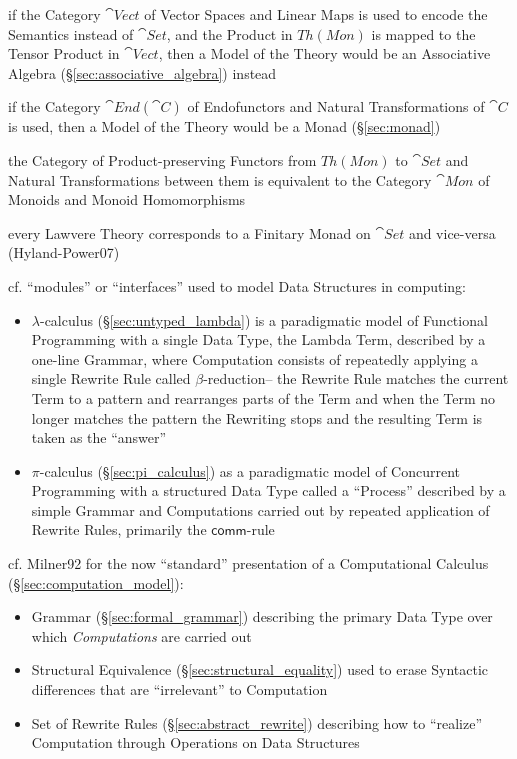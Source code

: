 if the Category $\cat{Vect}$ of Vector Spaces and Linear Maps is used to encode
the Semantics instead of $\cat{Set}$, and the Product in $Th(Mon)$ is mapped to
the Tensor Product in $\cat{Vect}$, then a Model of the Theory would be an
Associative Algebra (\S\ref{sec:associative_algebra}) instead

if the Category $\cat{End}(\cat{C})$ of Endofunctors and Natural Transformations
of $\cat{C}$ is used, then a Model of the Theory would be a Monad
(\S\ref{sec:monad})

the Category of Product-preserving Functors from $Th(Mon)$ to $\cat{Set}$ and
Natural Transformations between them is equivalent to the Category $\cat{Mon}$
of Monoids and Monoid Homomorphisms

every Lawvere Theory corresponds to a Finitary Monad on $\cat{Set}$ and
vice-versa (Hyland-Power07)

cf. ``modules'' or ``interfaces'' used to model Data Structures in computing:
\begin{itemize}
\item $\lambda$-calculus (\S\ref{sec:untyped_lambda}) is a paradigmatic model of
  Functional Programming with a single Data Type, the Lambda Term, described by
  a one-line Grammar, where Computation consists of repeatedly applying a single
  Rewrite Rule called $\beta$-reduction-- the Rewrite Rule matches the current
  Term to a pattern and rearranges parts of the Term and when the Term no longer
  matches the pattern the Rewriting stops and the resulting Term is taken as the
  ``answer''
\item $\pi$-calculus (\S\ref{sec:pi_calculus}) as a paradigmatic model of
  Concurrent Programming with a structured Data Type called a ``Process''
  described by a simple Grammar and Computations carried out by repeated
  application of Rewrite Rules, primarily the $\mathsf{comm}$-rule
\end{itemize}

cf. Milner92 \cite{milner92} for the now ``standard'' presentation of a
Computational Calculus (\S\ref{sec:computation_model}):
\begin{itemize}
  \item Grammar (\S\ref{sec:formal_grammar}) describing the primary Data Type
    over which \emph{Computations} are carried out
  \item Structural Equivalence (\S\ref{sec:structural_equality}) used to erase
    Syntactic differences that are ``irrelevant'' to Computation
  \item Set of Rewrite Rules (\S\ref{sec:abstract_rewrite}) describing how to
    ``realize'' Computation through Operations on Data Structures
\end{itemize}

